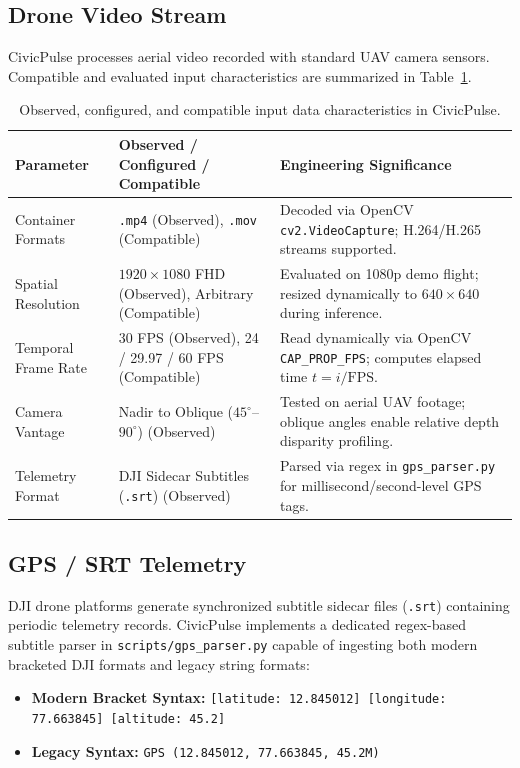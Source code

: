 \documentclass[11pt,a4paper]{article}
\begin{document}
\subsection{Drone Video Stream}
CivicPulse processes aerial video recorded with standard UAV camera sensors. Compatible and evaluated input characteristics are summarized in Table~\ref{tab:input_data_spec}.

\begin{table}[htbp]
\centering
\small
\caption{Observed, configured, and compatible input data characteristics in CivicPulse.}
\label{tab:input_data_spec}
\begin{tabularx}{\textwidth}{l l X}
\toprule
\textbf{Parameter} & \textbf{Observed / Configured / Compatible} & \textbf{Engineering Significance} \\
\midrule
Container Formats & \texttt{.mp4} (Observed), \texttt{.mov} (Compatible) & Decoded via OpenCV \texttt{cv2.VideoCapture}; H.264/H.265 streams supported. \\
Spatial Resolution & $1920\times 1080$ FHD (Observed), Arbitrary (Compatible) & Evaluated on 1080p demo flight; resized dynamically to $640\times 640$ during inference. \\
Temporal Frame Rate & 30 FPS (Observed), 24 / 29.97 / 60 FPS (Compatible) & Read dynamically via OpenCV \texttt{CAP\_PROP\_FPS}; computes elapsed time $t = i / \text{FPS}$. \\
Camera Vantage & Nadir to Oblique ($45^\circ$--$90^\circ$) (Observed) & Tested on aerial UAV footage; oblique angles enable relative depth disparity profiling. \\
Telemetry Format & DJI Sidecar Subtitles (\texttt{.srt}) (Observed) & Parsed via regex in \texttt{gps\_parser.py} for millisecond/second-level GPS tags. \\
\bottomrule
\end{tabularx}
\end{table}

\subsection{GPS / SRT Telemetry}
DJI drone platforms generate synchronized subtitle sidecar files (\texttt{.srt}) containing periodic telemetry records. CivicPulse implements a dedicated regex-based subtitle parser in \texttt{scripts/gps\_parser.py} capable of ingesting both modern bracketed DJI formats and legacy string formats:
\begin{itemize}[leftmargin=*]
    \item \textbf{Modern Bracket Syntax:} \texttt{[latitude: 12.845012] [longitude: 77.663845] [altitude: 45.2]}
    \item \textbf{Legacy Syntax:} \texttt{GPS (12.845012, 77.663845, 45.2M)}
\end{itemize}
\end{document}
